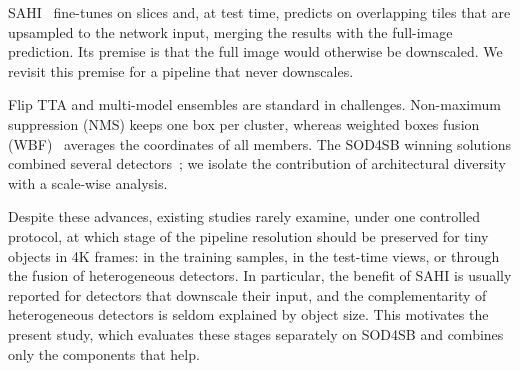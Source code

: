 \documentclass[5p,a4paper]{elsarticle}
\begin{document}
SAHI~\cite{akyon2022sahi} fine-tunes on slices and, at test time, predicts on overlapping tiles that are
upsampled to the network input, merging the results with the full-image prediction. Its premise is that the
full image would otherwise be downscaled. We revisit this premise for a pipeline that never downscales.

Flip TTA and multi-model ensembles are standard in challenges. Non-maximum suppression (NMS) keeps one box per
cluster, whereas weighted boxes fusion (WBF)~\cite{solovyev2021wbf} averages the coordinates of all members.
The SOD4SB winning solutions combined several detectors~\cite{kondo2023sod4sb,hou2023ensemble}; we isolate the
contribution of architectural diversity with a scale-wise analysis.

Despite these advances, existing studies rarely examine, under one controlled protocol, at which stage of the
pipeline resolution should be preserved for tiny objects in 4K frames: in the training samples, in the test-time
views, or through the fusion of heterogeneous detectors. In particular, the benefit of SAHI is usually reported for
detectors that downscale their input, and the complementarity of heterogeneous detectors is seldom
explained by object size. This motivates the present study, which evaluates these stages separately on SOD4SB and
combines only the components that help.

\end{document}
